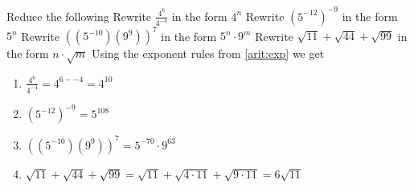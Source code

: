 \begin{ExerciseList}
\Exercise Reduce the following
\Question Rewrite $\frac{4^6}{4^{-4}}$ in the form $4^n$
\Question Rewrite $(5^{-12})^{-9}$ in the form $5^n$
\Question Rewrite $((5^{-10})(9^9))^7$ in the form $5^n \cdot 9^m$
\Question Rewrite $\sqrt{11} + \sqrt{44} + \sqrt{99}$ in the form $n \cdot \sqrt{m}$
\Answer Using the exponent rules from \ref{arit:exp} we get
\begin{enumerate}
\item\myindent $\frac{4^6}{4^{-4}} = 4^{6 - -4} = 4^{10}$
\item\myindent $(5^{-12})^{-9} = 5^{108}$
\item\myindent $((5^{-10})(9^9))^7 = 5^{-70} \cdot 9^{63}$
\item\myindent $\sqrt{11} + \sqrt{44} + \sqrt{99} =
                \sqrt{11} + \sqrt{4 \cdot 11} + \sqrt{9 \cdot 11} = 6\sqrt{11}$
\end{enumerate}
\end{ExerciseList}


​​
